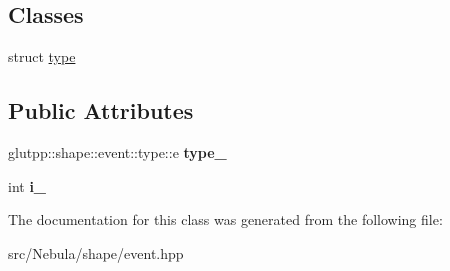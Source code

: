 \subsection*{\-Classes}
\begin{DoxyCompactItemize}
\item 
struct \hyperlink{structglutpp_1_1shape_1_1event_1_1type}{type}
\end{DoxyCompactItemize}
\subsection*{\-Public \-Attributes}
\begin{DoxyCompactItemize}
\item 
\hypertarget{classglutpp_1_1shape_1_1event_af0ccc0ef2ab93db722964bfd8012a9eb}{glutpp\-::shape\-::event\-::type\-::e {\bfseries type\-\_\-}}\label{classglutpp_1_1shape_1_1event_af0ccc0ef2ab93db722964bfd8012a9eb}

\item 
\hypertarget{classglutpp_1_1shape_1_1event_aedc6bd32e33dddd86846241d91f50f8a}{int {\bfseries i\-\_\-}}\label{classglutpp_1_1shape_1_1event_aedc6bd32e33dddd86846241d91f50f8a}

\end{DoxyCompactItemize}


\-The documentation for this class was generated from the following file\-:\begin{DoxyCompactItemize}
\item 
src/\-Nebula/shape/event.\-hpp\end{DoxyCompactItemize}
